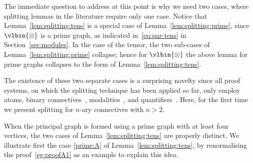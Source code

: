 \documentclass{lmcs} %
\def\ltens{\vlbin{\otimes}}
\theoremstyle{plain}
\begin{document}
\begin{rem}
The immediate question to address at this point is why we need two cases, where splitting lemmas in the literature require only one case.
Notice that Lemma~\ref{lem:splitting:tens} is a special case of Lemma~\ref{lem:splitting:prime}, since $\ltens$ is a prime graph, as indicated
in~\eqref{eq:par-tens} in Section~\ref{sec:modules}.
In the case of the tensor, the two sub-cases of Lemma~\ref{lem:splitting:prime} collapse;
hence for $\ltens$ the above lemma for prime graphs collapses to the form of Lemma~\ref{lem:splitting:tens}.

The existence of these two separate cases is a surprising novelty 
	since all proof systems, on which the splitting technique has been applied so far,
	only employ atoms, binary connectives~\cite{gug:SIS,tubella:phd}, modalities~\cite{dissvonlutz,SIS-V}, and quantifiers~\cite{ross:MAV1}. Here, for the first time we present splitting for $n$-ary connectives with $n>2$.
\end{rem}




When the principal graph is formed using a prime graph with at least four vertices, the two cases of Lemma~\ref{lem:splitting:tens} are properly distinct.
We illustrate first the case \ref{prime:A} of Lemma~\ref{lem:splitting:tens},
by renormalising the proof~\eqref{eg:proofA1} as an example to explain
this idea.
\end{document}
